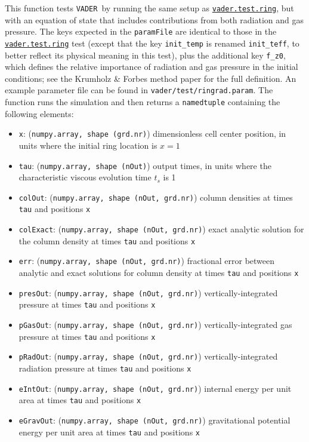 \documentclass[12pt]{article}
\newcommand{\vader}{\texttt{VADER}}
\begin{document}
This function tests \vader\ by running the same setup as \hyperref[sssec:vader.test.ring]{\texttt{vader.test.ring}}, but with an equation of state that includes contributions from both radiation and gas pressure. The keys expected in the \verb=paramFile= are identical to those in the \hyperref[sssec:vader.test.ring]{\texttt{vader.test.ring}} test (except that the key \verb=init_temp= is renamed \verb=init_teff=, to better reflect its physical meaning in this test), plus the additional key \verb=f_z0=, which defines the relative importance of radiation and gas pressure in the initial conditions; see the Krumholz \& Forbes method paper for the full definition. An example parameter file can be found in \verb=vader/test/ringrad.param=. The function runs the simulation and then returns a \verb=namedtuple= containing the following elements:
\begin{itemize}
\item \texttt{x}: (\texttt{numpy.array, shape (grd.nr)}) dimensionless cell center position, in units where the initial ring location is $x=1$
\item \texttt{tau}: (\texttt{numpy.array, shape (nOut)}) output times, in units where the characteristic viscous evolution time $t_s$ is 1
\item \texttt{colOut}: (\texttt{numpy.array, shape (nOut, grd.nr)}) column densities at times \verb=tau= and positions \verb=x=
\item \texttt{colExact}: (\texttt{numpy.array, shape (nOut, grd.nr)}) exact analytic solution for the column density at times \verb=tau= and positions \verb=x=
\item \texttt{err}: (\texttt{numpy.array, shape (nOut, grd.nr)}) fractional error between analytic and exact solutions for column density at times \verb=tau= and positions \verb=x=
\item \texttt{presOut}: (\texttt{numpy.array, shape (nOut, grd.nr)}) vertically-integrated pressure at times \verb=tau= and positions \verb=x=
\item \texttt{pGasOut}: (\texttt{numpy.array, shape (nOut, grd.nr)}) vertically-integrated gas pressure at times \verb=tau= and positions \verb=x=
\item \texttt{pRadOut}: (\texttt{numpy.array, shape (nOut, grd.nr)}) vertically-integrated radiation pressure at times \verb=tau= and positions \verb=x=
\item \texttt{eIntOut}: (\texttt{numpy.array, shape (nOut, grd.nr)}) internal energy per unit area at times \verb=tau= and positions \verb=x=
\item \texttt{eGravOut}: (\texttt{numpy.array, shape (nOut, grd.nr)}) gravitational potential energy per unit area at times \verb=tau= and positions \verb=x=

\end{itemize}
\end{document}
